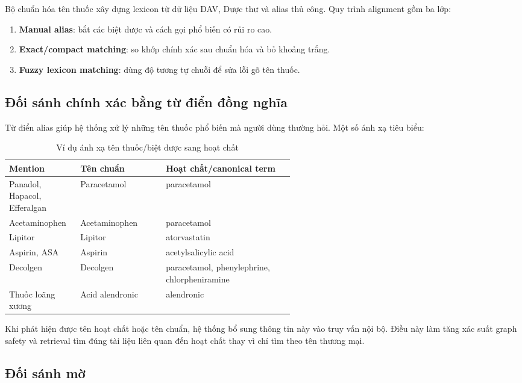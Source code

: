 Bộ chuẩn hóa tên thuốc xây dựng lexicon từ dữ liệu DAV, Dược thư và alias thủ công. Quy trình alignment gồm ba lớp:

\begin{enumerate}
  \item \textbf{Manual alias}: bắt các biệt dược và cách gọi phổ biến có rủi ro cao.
  \item \textbf{Exact/compact matching}: so khớp chính xác sau chuẩn hóa và bỏ khoảng trắng.
  \item \textbf{Fuzzy lexicon matching}: dùng độ tương tự chuỗi để sửa lỗi gõ tên thuốc.
\end{enumerate}

\subsection{Đối sánh chính xác bằng từ điển đồng nghĩa}

Từ điển alias giúp hệ thống xử lý những tên thuốc phổ biến mà người dùng thường hỏi. Một số ánh xạ tiêu biểu:

\begin{table}[H]
\centering
\small
\caption{Ví dụ ánh xạ tên thuốc/biệt dược sang hoạt chất}
\begin{tabularx}{\linewidth}{p{0.25\linewidth} p{0.30\linewidth} Y}
\toprule
\textbf{Mention} & \textbf{Tên chuẩn} & \textbf{Hoạt chất/canonical term} \\
\midrule
Panadol, Hapacol, Efferalgan & Paracetamol & paracetamol \\
Acetaminophen & Acetaminophen & paracetamol \\
Lipitor & Lipitor & atorvastatin \\
Aspirin, ASA & Aspirin & acetylsalicylic acid \\
Decolgen & Decolgen & paracetamol, phenylephrine, chlorpheniramine \\
Thuốc loãng xương & Acid alendronic & alendronic \\
\bottomrule
\end{tabularx}
\end{table}

Khi phát hiện được tên hoạt chất hoặc tên chuẩn, hệ thống bổ sung thông tin này vào truy vấn nội bộ. Điều này làm tăng xác suất graph safety và retrieval tìm đúng tài liệu liên quan đến hoạt chất thay vì chỉ tìm theo tên thương mại.

\subsection{Đối sánh mờ}

